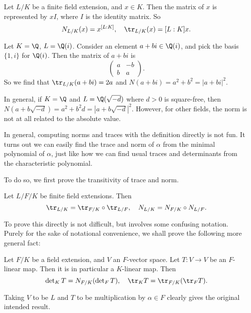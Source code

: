 \documentclass[a4paper]{article}
\begin{document}
\begin{eg}
  Let $L/K$ be a finite field extension, and $x \in K$. Then the matrix of $x$ is represented by $xI$, where $I$ is the identity matrix. So
  \[
    N_{L/K}(x) = x^{[L:K]},\quad \tr_{L/K}(x) = [L:K]x.
  \]
\end{eg}

\begin{eg}
  Let $K =\Q$, $L = \Q(i)$. Consider an element $a + bi \in \Q(i)$, and pick the basis $\{1, i\}$ for $\Q(i)$. Then the matrix of $a + bi$ is
  \[
    \begin{pmatrix}
      a & -b\\
      b & a
    \end{pmatrix}.
  \]
  So we find that $\tr_{L/K}(a + bi) = 2a$ and $N(a + bi) = a^2 + b^2 = |a + bi|^2$.

  In general, if $K = \Q$ and $L = \Q(\sqrt{-d})$ where $d > 0$ is square-free, then $N(a + b\sqrt{-d}) = a^2 + b^2 d = |a + b\sqrt{-d}|^2$. However, for other fields, the norm is not at all related to the absolute value.
\end{eg}
In general, computing norms and traces with the definition directly is not fun. It turns out we can easily find the trace and norm of $\alpha$ from the minimal polynomial of $\alpha$, just like how we can find usual traces and determinants from the characteristic polynomial.

To do so, we first prove the transitivity of trace and norm.
\begin{lemma}
  Let $L/F/K$ be finite field extensions. Then
  \[
    \tr_{L/K} = \tr_{F/K} \circ \tr_{L/F},\quad N_{L/K} = N_{F/K} \circ N_{L/F}.
  \]
\end{lemma}

To prove this directly is not difficult, but involves some confusing notation. Purely for the sake of notational convenience, we shall prove the following more general fact:
\begin{lemma}
  Let $F/K$ be a field extension, and $V$ an $F$-vector space. Let $T: V \to V$ be an $F$-linear map. Then it is in particular a $K$-linear map. Then
  \[
    \det\nolimits_K T = N_{F/K}(\det\nolimits_F T),\quad \tr_K T = \tr_{F/K}(\tr_F T).
  \]
\end{lemma}
Taking $V$ to be $L$ and $T$ to be multiplication by $\alpha \in F$ clearly gives the original intended result.
\end{document}
